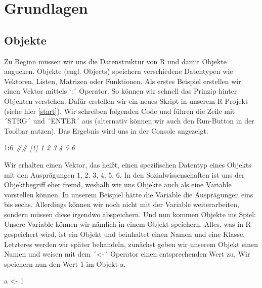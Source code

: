 \documentclass[
]{book}
\newenvironment{Shaded}{\begin{snugshade}}{\end{snugshade}}
\newcommand{\CommentTok}[1]{\textcolor[rgb]{0.56,0.35,0.01}{\textit{#1}}}
\newcommand{\DecValTok}[1]{\textcolor[rgb]{0.00,0.00,0.81}{#1}}
\newcommand{\NormalTok}[1]{#1}
\newcommand{\OperatorTok}[1]{\textcolor[rgb]{0.81,0.36,0.00}{\textbf{#1}}}
\newcommand{\StringTok}[1]{\textcolor[rgb]{0.31,0.60,0.02}{#1}}
\begin{document}
\hypertarget{grundlagen}{%
\chapter{Grundlagen}\label{grundlagen}}

\hypertarget{objekte}{%
\section{Objekte}\label{objekte}}

Zu Beginn müssen wir uns die Datenstruktur von R und damit Objekte angucken. Objekte (engl. Objects) speichern verschiedene Datentypen wie Vektoren, Listen, Matrizen oder Funktionen. Als erstes Beispiel erstellen wir einen Vektor mittels `:´ Operator. So können wir schnell das Prinzip hinter Objekten verstehen. Dafür erstellen wir ein neues Skript in unserem R-Projekt (siehe hier \ref{start}). Wir schreiben folgenden Code und führen die Zeile mit ´STRG´ und ´ENTER´ aus (alternativ können wir auch den Run-Button in der Toolbar nutzen). Das Ergebnis wird uns in der Console angezeigt.

\begin{Shaded}
\begin{Highlighting}[]
\DecValTok{1}\OperatorTok{:}\DecValTok{6}
\CommentTok{## [1] 1 2 3 4 5 6}
\end{Highlighting}
\end{Shaded}

Wir erhalten einen Vektor, das heißt, einen spezifischen Datentyp eines Objekts mit den Ausprägungen 1, 2, 3, 4, 5, 6. In den Sozialwissenschaften ist uns der Objektbegriff eher fremd, weshalb wir uns Objekte auch als eine Variable vorstellen können. In unserem Beispiel hätte die Variable die Ausprägungen eins bis sechs. Allerdings können wir noch nicht mit der Variable weiterarbeiten, sondern müssen diese irgendwo abspeichern. Und nun kommen Objekte ins Spiel: Unsere Variable können wir nämlich in einem Objekt speichern. Alles, was in R gespeichert wird, ist ein Objekt und beinhaltet einen Namen und eine Klasse. Letzteres werden wir später behandeln, zunächst geben wir unserem Objekt einen Namen und weisen mit dem ´\textless-´ Operator einen entsprechenden Wert zu. Wir speichern nun den Wert 1 im Objekt a.

\begin{Shaded}
\begin{Highlighting}[]
\NormalTok{a <-}\StringTok{ }\DecValTok{1}
\end{Highlighting}
\end{Shaded}
\end{document}
